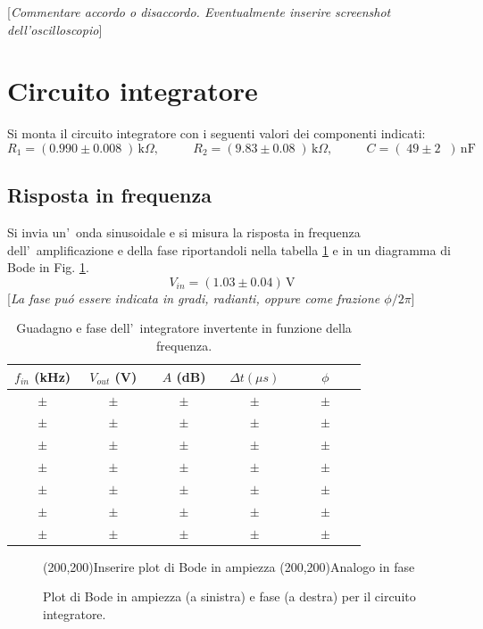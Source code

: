 \documentclass[10pt,a4paper]{article}
\newcommand{\rem}[1]{[\emph{#1}]}
\newcommand{\exn}{\phantom{xxx}}
\begin{document}
\rem{Commentare accordo o disaccordo. Eventualmente inserire screenshot dell'oscilloscopio}
%
\section{Circuito integratore}
Si monta il circuito integratore con i seguenti valori  dei componenti indicati: 
\[
R_1 = (0.990 \pm  0.008\;) \,\mathrm{k}\Omega, \:\:\;\:\exn 
R_2 = (9.83 \pm 0.08 \;) \,\mathrm{k}\Omega, \:\:\;\:\exn 
C = (\;49 \pm 2 \;\;)\,\mathrm{nF}
\]

\subsection{Risposta in frequenza}

Si invia un'~onda sinusoidale e si misura la risposta in frequenza dell'~amplificazione e della fase riportandoli 
nella tabella \ref{tab:bodeinte} e in un diagramma di Bode in Fig. \ref{fig:bodeinte}. 
\[
V_{in} = (1.03 \pm 0.04 )\,\mathrm{V}
\]
\rem{La fase pu\'o essere indicata in gradi, radianti, oppure come frazione $\phi/2\pi$}
%
\begin{table}[h]
\caption{Guadagno e fase dell'~integratore invertente in funzione della frequenza.}
\label{tab:bodeinte}
\begin{center}
\begin{tabular}{|c|c|c|c|c|}
\hline
$f_{in}$ (kHz) & $V_{out}$ (V) & $A$ (dB) & $\Delta t (\mu s)$ & $\phi$ \\
\hline
$\exn \pm \exn $ & $\exn \pm \exn $ & $\exn \pm \exn $ & $\exn \pm \exn $ & $\exn \pm \exn $ \\
\hline
$\exn \pm \exn $ & $\exn \pm \exn $ & $\exn \pm \exn $ & $\exn \pm \exn $ & $\exn \pm \exn $ \\
\hline
$\exn \pm \exn $ & $\exn \pm \exn $ & $\exn \pm \exn $ & $\exn \pm \exn $ & $\exn \pm \exn $ \\
\hline
$\exn \pm \exn $ & $\exn \pm \exn $ & $\exn \pm \exn $ & $\exn \pm \exn $ & $\exn \pm \exn $ \\
\hline
$\exn \pm \exn $ & $\exn \pm \exn $ & $\exn \pm \exn $ & $\exn \pm \exn $ & $\exn \pm \exn $ \\
\hline
$\exn \pm \exn $ & $\exn \pm \exn $ & $\exn \pm \exn $ & $\exn \pm \exn $ & $\exn \pm \exn $ \\
\hline
$\exn \pm \exn $ & $\exn \pm \exn $ & $\exn \pm \exn $ & $\exn \pm \exn $ & $\exn \pm \exn $ \\
\hline
\end{tabular}
\end{center}
\end{table} 
%
\begin{figure}[htb]
\begin{center}
\framebox(200,200){Inserire plot di Bode in ampiezza}
\framebox(200,200){Analogo in fase}
\end{center}
\caption{\small Plot di Bode in ampiezza (a sinistra) e fase (a destra) per il circuito integratore.}
\label{fig:bodeinte}
\end{figure}
%
\end{document}
